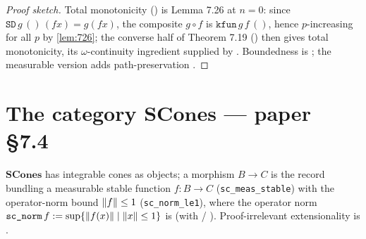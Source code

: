 \begin{proof}[Proof sketch]
Total monotonicity () is
Lemma 7.26 at $n = 0$: since $\texttt{SD}\,g\,()\,(f x) = g(f x)$, the
composite $g \circ f$ is $\texttt{kfun}\,g\,f\,()$, hence $p$-increasing
for all $p$ by \autoref{lem:726}; the converse half of Theorem 7.19
() then gives total
monotonicity, its $\omega$-continuity ingredient supplied by
. Boundedness is
; the measurable version adds
path-preservation .
\end{proof}

\section{The category \texorpdfstring{$\mathbf{SCones}$}{SCones} --- paper \S7.4}\label{sec:scones}

\begin{definition}\label{def:scones-hom}
\rocqok{}
$\mathbf{SCones}$ has integrable cones as objects; a morphism
$B \to C$ is the record
 bundling a measurable stable
function $f : B \to C$ (\texttt{sc\_meas\_stable}) with the operator-norm
bound $\lVert f \rVert \leq 1$ (\texttt{sc\_norm\_le1}), where the operator
norm $\texttt{sc\_norm}\,f := \sup\{\lVert f(x) \rVert \mid \lVert x \rVert \leq 1\}$
is  (with
 /
). Proof-irrelevant
extensionality is .
\end{definition}

